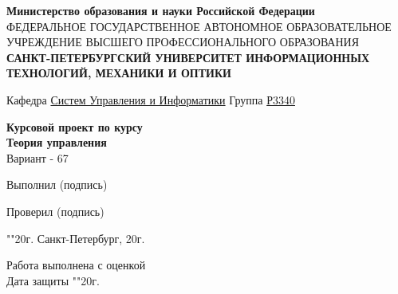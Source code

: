 \begin{titlepage}
    \centering
    {\fontsize{12pt}{5cm}\selectfont \bfseries Министерство образования и науки Российской Федерации} \\ \vspace{0.5cm}
    {\fontsize{7pt}{5cm}\selectfont ФЕДЕРАЛЬНОЕ ГОСУДАРСТВЕННОЕ АВТОНОМНОЕ ОБРАЗОВАТЕЛЬНОЕ УЧРЕЖДЕНИЕ ВЫСШЕГО ПРОФЕССИОНАЛЬНОГО ОБРАЗОВАНИЯ} \\ 
    \vspace{1cm}
    {\fontsize{12pt}{5cm}\selectfont \bfseries САНКТ-ПЕТЕРБУРГСКИЙ УНИВЕРСИТЕТ ИНФОРМАЦИОННЫХ ТЕХНОЛОГИЙ, МЕХАНИКИ И ОПТИКИ} \\ \vspace{1.5cm}

    {\fontsize{14pt}{5cm}\selectfont Кафедра \hspace{1cm} \underline{Систем Управления и Информатики}  \hspace{1cm} Группа \underline{Р3340}} \\ 
    \vspace{2cm}

    {\fontsize{20pt}{5cm}\selectfont \bfseries Курсовой проект по курсу} \\
    {\fontsize{20pt}{5cm}\selectfont \bfseries Теория управления} \\
    {\fontsize{14pt}{5cm}\selectfont Вариант - 67} \\
    \vspace{1.5cm}

    \flushleft

    {Выполнил \hspace{2cm}  (подпись)} \\
    \vspace{2cm}

    {Проверил \hspace{2cm}  (подпись)} \\
    \vspace{5cm}

    "\underline{\hspace{0.7cm}}"\hspace{0.2cm}\underline{\hspace{2cm}}\hspace{0.2cm}20\underline{\hspace{0.7cm}}г. \hspace{2cm} Санкт-Петербург, \hspace{2cm} 20\underline{\hspace{0.7cm}}г. \\ \vspace{1cm}

    Работа выполнена с оценкой \hspace{1cm} \underline{\hspace{8cm}} \\ 
    \vspace{1cm}
    Дата защиты "\underline{\hspace{0.7cm}}"\hspace{0.2cm}\underline{\hspace{2cm}}\hspace{0.2cm}20\underline{\hspace{0.7cm}}г.
\end{titlepage}